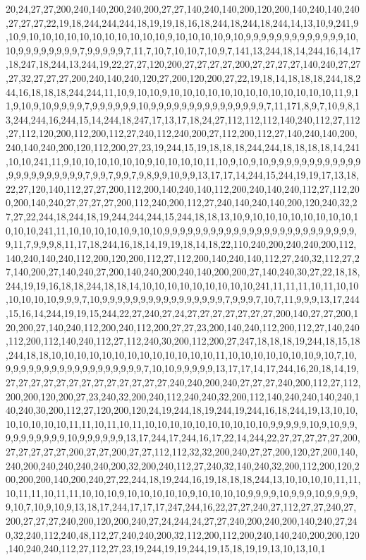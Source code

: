20,24,27,27,200,240,140,200,240,200,27,27,140,240,140,200,120,200,140,240,140,240,27,27,27,22,19,18,244,244,244,18,19,19,18,16,18,244,18,244,18,244,14,13,10,9,241,9,10,9,10,10,10,10,10,10,10,10,10,10,10,9,10,10,10,10,9,10,9,9,9,9,9,9,9,9,9,9,9,9,9,10,10,9,9,9,9,9,9,9,9,7,9,9,9,9,9,7,11,7,10,7,10,10,7,10,9,7,141,13,244,18,14,244,16,14,17,18,247,18,244,13,244,19,22,27,27,120,200,27,27,27,27,200,27,27,27,27,140,240,27,27,27,32,27,27,27,200,240,140,240,120,27,200,120,200,27,22,19,18,14,18,18,18,244,18,244,16,18,18,18,244,244,11,10,9,10,10,9,10,10,10,10,10,10,10,10,10,10,10,10,10,11,9,11,9,10,9,10,9,9,9,9,7,9,9,9,9,9,9,10,9,9,9,9,9,9,9,9,9,9,9,9,9,9,9,7,11,171,8,9,7,10,9,8,13,244,244,16,244,15,14,244,18,247,17,13,17,18,24,27,112,112,112,140,240,112,27,112,27,112,120,200,112,200,112,27,240,112,240,200,27,112,200,112,27,140,240,140,200,240,140,240,200,120,112,200,27,23,19,244,15,19,18,18,18,244,244,18,18,18,18,14,241,10,10,241,11,9,10,10,10,10,10,10,9,10,10,10,10,11,10,9,10,9,10,9,9,9,9,9,9,9,9,9,9,9,9,9,9,9,9,9,9,9,9,9,9,7,9,9,7,9,9,7,9,8,9,9,10,9,9,13,17,17,14,244,15,244,19,19,17,13,18,22,27,120,140,112,27,27,200,112,200,140,240,140,112,200,240,140,240,112,27,112,200,200,140,240,27,27,27,27,200,112,240,200,112,27,240,140,240,140,200,120,240,32,27,27,22,244,18,244,18,19,244,244,244,15,244,18,18,13,10,9,10,10,10,10,10,10,10,10,10,10,10,241,11,10,10,10,10,10,9,10,10,9,9,9,9,9,9,9,9,9,9,9,9,9,9,9,9,9,9,9,9,9,9,9,9,9,9,11,7,9,9,9,8,11,17,18,244,16,18,14,19,19,18,14,18,22,110,240,200,240,240,200,112,140,240,140,240,112,200,120,200,112,27,112,200,140,240,140,112,27,240,32,112,27,27,140,200,27,140,240,27,200,140,240,200,240,140,200,200,27,140,240,30,27,22,18,18,244,19,19,16,18,18,244,18,18,14,10,10,10,10,10,10,10,10,10,241,11,11,11,10,11,10,10,10,10,10,10,9,9,9,7,10,9,9,9,9,9,9,9,9,9,9,9,9,9,9,9,9,7,9,9,9,7,10,7,11,9,9,9,13,17,244,15,16,14,244,19,19,15,244,22,27,240,27,24,27,27,27,27,27,27,27,200,140,27,27,200,120,200,27,140,240,112,200,240,112,200,27,27,23,200,140,240,112,200,112,27,140,240,112,200,112,140,240,112,27,112,240,30,200,112,200,27,247,18,18,18,19,244,18,15,18,244,18,18,10,10,10,10,10,10,10,10,10,10,10,10,10,11,10,10,10,10,10,10,10,9,10,7,10,9,9,9,9,9,9,9,9,9,9,9,9,9,9,9,9,9,9,7,10,10,9,9,9,9,9,13,17,17,14,17,244,16,20,18,14,19,27,27,27,27,27,27,27,27,27,27,27,27,27,240,240,200,240,27,27,27,240,200,112,27,112,200,200,120,200,27,23,240,32,200,240,112,240,240,32,200,112,140,240,240,140,240,140,240,30,200,112,27,120,200,120,24,19,244,18,19,244,19,244,16,18,244,19,13,10,10,10,10,10,10,10,11,11,10,11,10,11,10,10,10,10,10,10,10,10,10,10,9,9,9,9,9,10,9,10,9,9,9,9,9,9,9,9,9,9,10,9,9,9,9,9,9,13,17,244,17,244,16,17,22,14,244,22,27,27,27,27,27,200,27,27,27,27,27,200,27,27,200,27,27,112,112,32,32,200,240,27,27,200,120,27,200,140,240,200,240,240,240,240,200,32,200,240,112,27,240,32,140,240,32,200,112,200,120,200,200,200,140,200,240,27,22,244,18,19,244,16,19,18,18,18,244,13,10,10,10,10,11,11,10,11,11,10,11,11,10,10,10,9,10,10,10,10,10,9,10,10,10,10,9,9,9,9,10,9,9,9,10,9,9,9,9,9,10,7,10,9,10,9,13,18,17,244,17,17,17,247,244,16,22,27,27,240,27,112,27,27,240,27,200,27,27,27,240,200,120,200,240,27,24,244,24,27,27,240,200,240,200,140,240,27,240,32,240,112,240,48,112,27,240,240,200,32,112,200,112,200,240,140,240,200,200,120,140,240,240,112,27,112,27,23,19,244,19,19,244,19,15,18,19,19,13,10,13,10,1